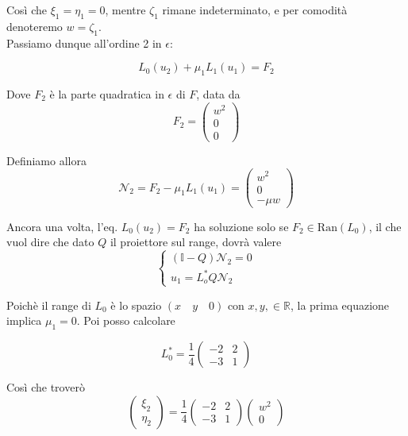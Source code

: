 \documentclass{report}
\begin{document}
\begin{example}
    Così che $\xi_1 = \eta_1 = 0$, mentre $\zeta_1$ rimane indeterminato, e per comodità denoteremo $w = \zeta_1$. \\
    Passiamo dunque all'ordine 2 in $\epsilon$: 

    \begin{equation}
        L_0(u_2) + \mu_1L_1(u_1) = F_2
    \end{equation}

    Dove $F_2$ è la parte quadratica in $\epsilon$ di $F$, data da 
    \begin{equation}
        F_2 = \begin{pmatrix}
            w^2 \\ 0 \\ 0
        \end{pmatrix}
    \end{equation}

    Definiamo allora 
    \begin{equation}
        \mathcal{N}_2 = F_2 - \mu_1L_1(u_1) = \begin{pmatrix}
            w^2 \\ 0 \\ -\mu w
        \end{pmatrix}
    \end{equation}

    Ancora una volta, l'eq. $L_0(u_2) = F_2$ ha soluzione solo se $F_2 \in \text{Ran}(L_0)$, il che vuol dire che dato $Q$ il proiettore sul range, dovrà valere 
    \[\begin{cases}
        (\mathbb{I}-Q)\mathcal{N}_2 = 0 \\ u_1 = L_o^*Q\mathcal{N}_2
    \end{cases}\]

    Poichè il range di $L_0$ è lo spazio $(x \quad y \quad 0)$ con $x, y, \in \mathbb{R}$, la prima equazione implica $\mu_1 = 0$. Poi posso calcolare 

    \begin{equation}
        L_0^* = \frac{1}{4}\begin{pmatrix}
            -2 & 2 \\ -3 & 1
        \end{pmatrix}
    \end{equation}

    Così che troverò
    \begin{equation}
        \begin{pmatrix}
            \xi_2 \\ \eta_2
        \end{pmatrix}
        = \frac{1}{4}\begin{pmatrix}
            -2 & 2 \\ -3 & 1
        \end{pmatrix}\begin{pmatrix}
            w^2 \\ 0
        \end{pmatrix}
    \end{equation}


\end{example}
\end{document}
